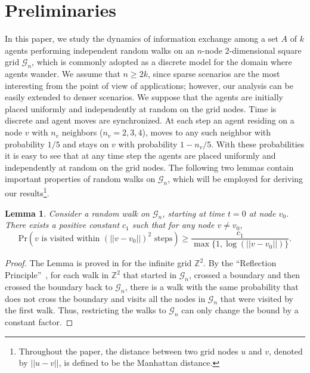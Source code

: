 \documentclass[11pt]{article}
\newcommand{\dist}[1]{||#1||}
\newcommand{\prob}[1]{\mathrm{Pr}\left({#1}\right)}
\newcommand{\Z}{\mathbb{Z}}
\newcommand{\grid}{\mathcal{G}_n}
\newtheorem{lemm}{Lemma}
\begin{document}
\section{Preliminaries}
\label{sec:prelim}
In this paper, we study the dynamics of information exchange among a
set $A$ of $k$ agents performing independent random walks on an
$n$-node 2-dimensional square grid $\grid$,
which is commonly adopted as a discrete model
for the domain where agents wander.
We assume that $n \geq 2k$,
since sparse scenarios are the most interesting
from the point of view of applications;
however, our analysis can be easily extended to denser scenarios.
We suppose that the agents
are initially placed uniformly and independently at random on the grid
nodes. Time is discrete and agent moves are synchronized.  At each
step an agent residing on a node $v$ with $n_v$ neighbors ($n_v =
2,3,4$), moves to any such neighbor with probability $1/5$ and
stays on $v$ with probability $1-n_v/5$. With these probabilities it
is easy to see that at any time step the agents are placed
uniformly and independently at random on the grid nodes.
The following two lemmas contain important properties
of random walks on $\grid$, which will be employed for deriving our 
results\footnote{Throughout the paper, the distance between two
grid nodes $u$ and $v$, denoted by $\dist{u-v}$, is defined to be the
Manhattan distance.}. 
\begin{lemm}
\label{lemm:SRW}
Consider a random walk on $\grid$, starting at time $t=0$ at node $v_0$.
There exists a positive constant $c_1$ such that
for any node $v \neq v_0$,
\[
\prob{v \mbox{ is visited within } (\dist{v-v_0})^2 \mbox{ steps}}
\geq \frac{c_1}{\max \{1,\log (\dist{v-v_0})\}}.
\]
\end{lemm}
\begin{proof}
The Lemma is proved in \cite[Theorem~2.2]{AlvesMP02} for the infinite
grid $\Z^2$.  By the ``Reflection Principle''~\cite[Page 72]{Feller68},
for each walk in $\mathbb{Z}^2$ that started in
$\grid$, crossed a boundary and then crossed the boundary back to $\grid$,
there is a walk with the same probability that does not cross the
boundary and visits all the nodes in $\grid$ that were visited by the
first walk.  Thus, restricting the walks to $\grid$ can only change the
bound by a constant factor.
\end{proof}
\end{document}

